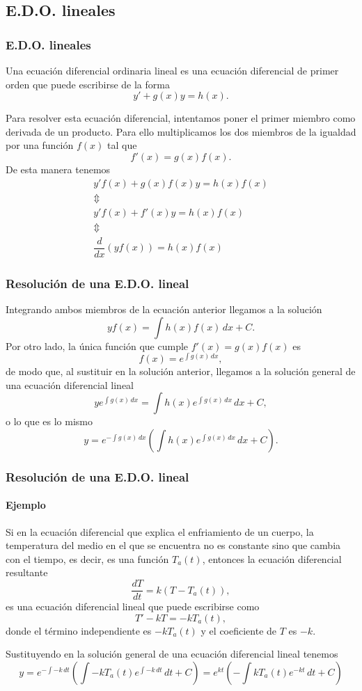 \subsection{E.D.O. lineales}
\begin{frame}
\frametitle{E.D.O. lineales}
\begin{definicion}[E.D.O. lineal]
Una ecuación diferencial ordinaria lineal es una ecuación diferencial de primer orden que puede escribirse de la forma
\[y'+g(x)y = h(x).\]
\end{definicion}

Para resolver esta ecuación diferencial, intentamos poner el primer miembro como derivada de un producto. Para ello multiplicamos los dos miembros de la igualdad por una función $f(x)$ tal que 
\[f'(x)=g(x)f(x).\]
De esta manera tenemos
\[
\begin{array}{c}
y'f(x)+g(x)f(x)y=h(x)f(x)\\
\Updownarrow\\
y'f(x)+f'(x)y=h(x)f(x)\\
\Updownarrow\\
\dfrac{d}{dx}(yf(x))=h(x)f(x)
\end{array}
\]
\end{frame}


\begin{frame}
\frametitle{Resolución de una E.D.O. lineal}
Integrando ambos miembros de la ecuación anterior llegamos a la solución
\[
yf(x)=\int h(x)f(x)\,dx+C.
\]
Por otro lado, la única función que cumple $f'(x)=g(x)f(x)$ es
\[
f(x)=e^{\int g(x)\,dx},
\]
de modo que, al sustituir en la solución anterior, llegamos a la solución general de una ecuación diferencial lineal
\[
ye^{\int g(x)\,dx}=\int h(x) e^{\int g(x)\,dx}\,dx+C,
\]
o lo que es lo mismo
\[
y=e^{-\int g(x)\,dx}\left(\int h(x)e^{\int g(x)\,dx}\,dx+C\right).
\]
\end{frame}


\begin{frame}
\frametitle{Resolución de una E.D.O. lineal}
\framesubtitle{Ejemplo}
Si en la ecuación diferencial que explica el enfriamiento de un cuerpo, la temperatura del medio en el que se encuentra no es constante sino que cambia con el tiempo, es decir, es una función $T_a(t)$, entonces la ecuación diferencial resultante 
\[
\frac{dT}{dt}=k(T-T_a(t)),
\]
es una ecuación diferencial lineal que puede escribirse como
\[
T'-kT=-kT_a(t),
\]
donde el término independiente es $-kT_a(t)$ y el coeficiente de $T$ es $-k$.

Sustituyendo en la solución general de una ecuación diferencial lineal tenemos
\[
y=e^{-\int -k\,dt}\left(\int -kT_a(t)e^{\int -k\,dt}\,dt+C\right)=
e^{kt}\left(-\int kT_a(t)e^{-kt}\,dt+C\right)
\]
\end{frame}


